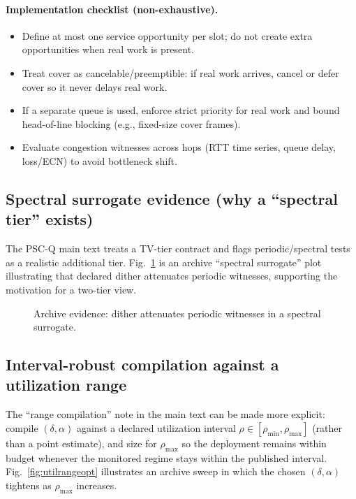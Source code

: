 \documentclass[11pt]{article}
\theoremstyle{definition}
\theoremstyle{remark}
\begin{document}
\paragraph{Implementation checklist (non-exhaustive).}
\begin{itemize}[leftmargin=1.2em]
\item Define at most one service opportunity per slot; do not create extra opportunities when real work is present.
\item Treat cover as cancelable/preemptible: if real work arrives, cancel or defer cover so it never delays real work.
\item If a separate queue is used, enforce strict priority for real work and bound head-of-line blocking (e.g., fixed-size cover frames).
\item Evaluate congestion witnesses across hops (RTT time series, queue delay, loss/ECN) to avoid bottleneck shift.
\end{itemize}

\subsection{Spectral surrogate evidence (why a ``spectral tier'' exists)}
The PSC-Q main text treats a TV-tier contract and flags periodic/spectral tests as a realistic additional tier.
Fig.~\ref{fig:spectral} is an archive ``spectral surrogate'' plot illustrating that declared dither attenuates periodic witnesses,
supporting the motivation for a two-tier view.

\begin{figure}[t]
\centering
{}
\caption{Archive evidence: dither attenuates periodic witnesses in a spectral surrogate.}
\label{fig:spectral}
\end{figure}

\subsection{Interval-robust compilation against a utilization range}
The ``range compilation'' note in the main text can be made more explicit:
compile $(\delta,\alpha)$ against a declared utilization interval $\rho\in[\rho_{\min},\rho_{\max}]$ (rather than a point estimate),
and size for $\rho_{\max}$ so the deployment remains within budget whenever the monitored regime stays within the published interval.
Fig.~\ref{fig:utilrangeopt} illustrates an archive sweep in which the chosen $(\delta,\alpha)$ tightens as $\rho_{\max}$ increases.
\end{document}
